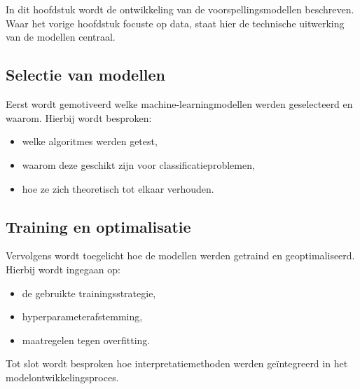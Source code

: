 \chapter{}%
\label{ch:modelontwikkeling}

In dit hoofdstuk wordt de ontwikkeling van de voorspellingsmodellen beschreven. 
Waar het vorige hoofdstuk focuste op data, staat hier de technische uitwerking van de modellen centraal.

\section{Selectie van modellen}

Eerst wordt gemotiveerd welke machine-learningmodellen werden geselecteerd en waarom. Hierbij wordt besproken:
\begin{itemize}
    \item welke algoritmes werden getest,
    \item waarom deze geschikt zijn voor classificatieproblemen,
    \item hoe ze zich theoretisch tot elkaar verhouden.
\end{itemize}

\section{Training en optimalisatie}

Vervolgens wordt toegelicht hoe de modellen werden getraind en geoptimaliseerd. Hierbij wordt ingegaan op:
\begin{itemize}
    \item de gebruikte trainingsstrategie,
    \item hyperparameterafstemming,
    \item maatregelen tegen overfitting.
\end{itemize}

Tot slot wordt besproken hoe interpretatiemethoden werden geïntegreerd in het modelontwikkelingsproces.